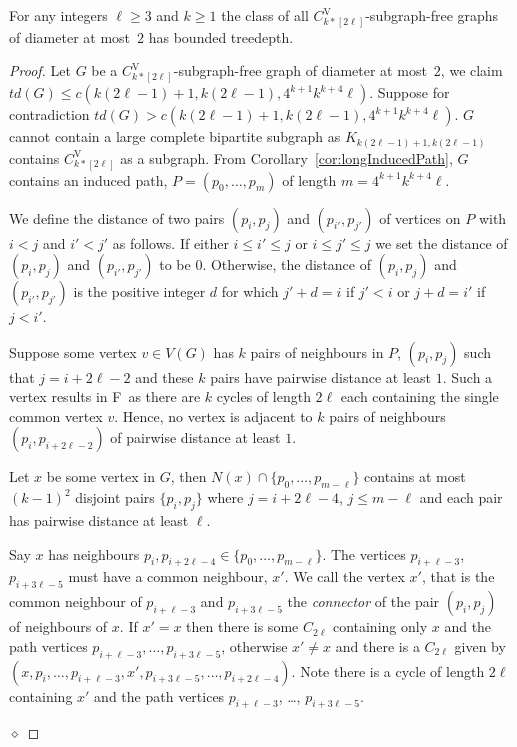 \documentclass[runningheads,envcountsame]{llncs}
\newcommand{\sharedVertex}[1]{C^{\mathrm{V}}_{#1}}
\newcommand{\forbiddenGraph}{F}
\newenvironment{claimproof}
{\noindent {\em Proof of Claim:} }
{\hfill $\diamond$ \smallskip}
\begin{document}
\begin{theorem}  
\label{thm:diam2-CVktimesl}
    For any integers $\ell\geq 3$ and $k\geq 1$ the class of all $\sharedVertex{k*[2\ell]}$-subgraph-free graphs of diameter at most~$2$ has bounded treedepth.
\end{theorem}
\begin{proof}
    Let $G$ be a $\sharedVertex{k*[2\ell]}$-subgraph-free graph of diameter at most~$2$, we claim $td(G) \leq c(k (2\ell-1)+1, k (2\ell-1),4^{k+1}k^{k+4}\ell)$. Suppose for contradiction $td(G) > c(k (2\ell-1)+1, k (2\ell-1),4^{k+1}k^{k+4}\ell)$. $G$ cannot contain a large complete bipartite subgraph as $K_{k (2\ell-1)+1, k (2\ell-1)}$ contains $\sharedVertex{k*[2\ell]}$ as a subgraph. From Corollary~\ref{cor:longInducedPath},  $G$ contains an induced path, $P=(p_0,\dots,p_m)$ 
    of length $m=4^{k+1}k^{k+4}\ell$. 

    We define the distance of two pairs  $(p_i,p_j)$ and $(p_{i'},p_{j'})$ of vertices on $P$ with $i<j$ and $i'<j'$ as follows. If either $i\leq i'\leq j$ or $i\leq j'\leq j$ we set the distance of $(p_i,p_j)$ and $(p_{i'},p_{j'})$ to be $0$. Otherwise, the distance of $(p_i,p_j)$ and $(p_{i'},p_{j'})$ is the positive integer $d$ for which $j'+d=i$ if $j'<i$ or $j+d=i'$ if $j<i'$.
    
    Suppose some vertex $v \in V(G)$ has $k$  pairs of neighbours in $P$, $(p_i,p_j)$ such that $j = i+2\ell-2$ and these $k$ pairs have pairwise distance at least $1$. Such a vertex results in \forbiddenGraph\ as there are $k$ cycles of length $2\ell$ each containing the single common vertex $v$. Hence, no vertex is adjacent to $k$ pairs of neighbours $(p_i,p_{i+2\ell-2})$ of pairwise distance at least $1$.

    \begin{mclaim}\label{clm:dist2l-4}
            Let $x$ be some vertex in $G$, then $N(x) \cap \{p_0,\dots,p_{m-\ell}\}$ contains at most $(k-1)^2$ disjoint pairs $\{p_i,p_j\}$ where $j = i+2\ell-4$, $j \leq m- \ell$ and each pair has pairwise distance at least $\ell$.
    \end{mclaim}
    \begin{claimproof}
            Say $x$ has neighbours $p_i, p_{i+2\ell-4} \in \{p_0,\dots,p_{m-\ell}\}$. The vertices $p_{i+\ell-3}$, $p_{i+3\ell-5}$ must have a common neighbour, $x'$. We call the vertex $x'$, that is the common neighbour of $p_{i+\ell-3}$ and $p_{i+3\ell-5}$ the \emph{connector} of the pair $(p_i,p_j)$ of neighbours of $x$. If $x'=x$ then there is some $C_{2\ell}$ containing only $x$ and the path vertices $p_{i+\ell-3}, \dots, p_{i+3\ell-5}$, otherwise $x'\neq x$ and there is a $C_{2\ell}$ given by $(x, p_i, \ldots, p_{i+\ell-3}, x', p_{i+3\ell-5}, \ldots, p_{i+2\ell-4})$. Note there is a cycle of length $2\ell$ containing $x'$ and the path vertices $p_{i+\ell-3}$, \ldots, $p_{i+3\ell-5}$.


\end{claimproof}
\end{proof}
\end{document}
